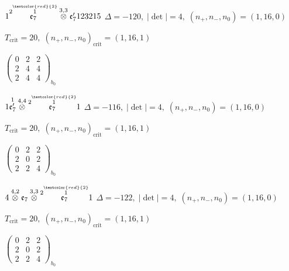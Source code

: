 \documentclass[10pt]{article}
\begin{document}
\smallskip

$1\overset{2\overset{\textcolor{red}{2}}{1}}{\mathfrak{e}_7}\overset{3,3}{\otimes}\mathfrak{e}_7'123215$ \quad $\Delta=-120,\; |\det|=4,\; (n_+,n_-,n_0)=(1,16,0)$

\hspace{1em}$T_{\text{crit}}=20,\; (n_+,n_-,n_0)_{\text{crit}}=(1,16,1)$

\hspace{2em}$\left(\begin{smallmatrix}0 & 2 & 2 \\ 2 & 4 & 4 \\ 2 & 4 & 4\end{smallmatrix}\right)_{\!b_0}$

\smallskip

$1\overset{1}{\mathfrak{e}_7'}\overset{4,4}{\otimes}\overset{2\overset{\textcolor{red}{2}}{1}}{\mathfrak{e}_7}1$ \quad $\Delta=-116,\; |\det|=4,\; (n_+,n_-,n_0)=(1,16,0)$

\hspace{1em}$T_{\text{crit}}=20,\; (n_+,n_-,n_0)_{\text{crit}}=(1,16,1)$

\hspace{2em}$\left(\begin{smallmatrix}0 & 2 & 2 \\ 2 & 0 & 2 \\ 2 & 2 & 4\end{smallmatrix}\right)_{\!b_0}$

\smallskip

$4\overset{4,2}{\otimes}\mathfrak{e}_7\overset{3,3}{\otimes}\overset{2\overset{\textcolor{red}{2}}{1}}{\mathfrak{e}_7}1$ \quad $\Delta=-122,\; |\det|=4,\; (n_+,n_-,n_0)=(1,16,0)$

\hspace{1em}$T_{\text{crit}}=20,\; (n_+,n_-,n_0)_{\text{crit}}=(1,16,1)$

\hspace{2em}$\left(\begin{smallmatrix}0 & 2 & 2 \\ 2 & 0 & 2 \\ 2 & 2 & 4\end{smallmatrix}\right)_{\!b_0}$
\end{document}
